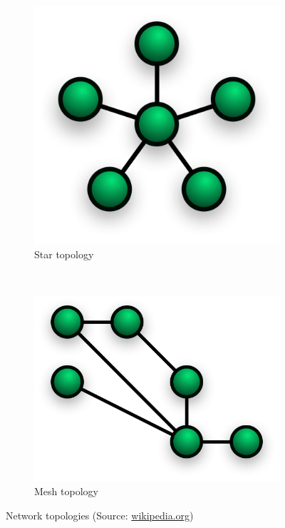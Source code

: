 \begin{figure}
    \centering
    \begin{subfigure}[b]{0.3\textwidth}
      \includegraphics[width=\textwidth]{res/star.png}
      \caption{Star topology}
      \label{fig:star}
    \end{subfigure}
    ~
    \begin{subfigure}[b]{0.3\textwidth}
        \includegraphics[width=\textwidth]{res/mesh.png}
        \caption{Mesh topology}
        \label{fig:mesh}
    \end{subfigure}
    \caption{Network topologies (Source: \href{en.wikipedia.org/wiki/Network_topology}{wikipedia.org})}
    \label{fig:topology}
\end{figure}

